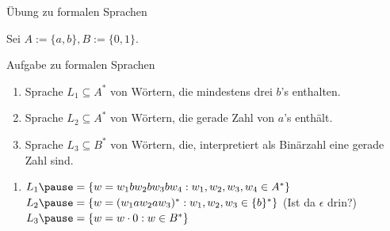 \begin{frame}{Übung zu formalen Sprachen}
	
	Sei $A := \{a, b\}, B := \{0, 1\}$.
	
	\begin{taskblock}{Aufgabe zu formalen Sprachen}
		\begin{enumerate}
			\item Sprache $L_1 \subseteq A^*$ von Wörtern, die mindestens drei $b$'s enthalten.
			\item Sprache $L_2 \subseteq A^*$ von Wörtern, die gerade Zahl von $a$'s enthält.
			\item Sprache $L_3 \subseteq B^*$ von Wörtern, die, interpretiert als Binärzahl eine gerade Zahl sind.
		\end{enumerate}
	\end{taskblock}

	\pause
	
	\begin{enumerate}
		\item $L_1 \pause = \{w = w_1  b  w_2  b  w_3 b w_4 : w_1,w_2,w_3,w_4 \in A^* \}$
		\pitem $L_2 \pause = \{w = (w_1 a w_2 a w_3)^* : w_1,w_2,w_3 \in \{b\}^* \}$ \pause (Ist da $\epsilon$ drin?)
		\pitem $L_3 \pause = \{w = w \cdot 0 : w \in B^* \}$
	\end{enumerate}
\end{frame}

